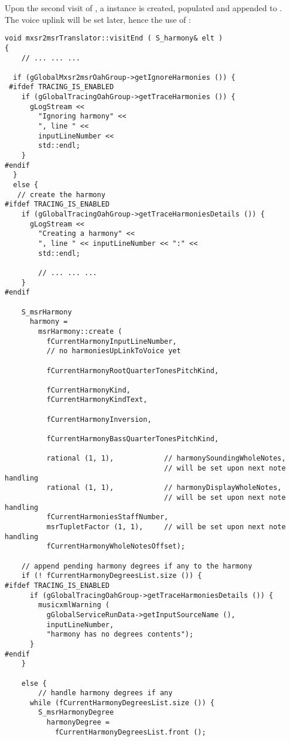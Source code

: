 Upon the second visit of , a  instance is created, populated and appended to .\\
The voice uplink will be set later, hence the use of :
\begin{lstlisting}[language=CPlusPlus]
void mxsr2msrTranslator::visitEnd ( S_harmony& elt )
{
	// ... ... ...

  if (gGlobalMxsr2msrOahGroup->getIgnoreHarmonies ()) {
 #ifdef TRACING_IS_ENABLED
    if (gGlobalTracingOahGroup->getTraceHarmonies ()) {
      gLogStream <<
        "Ignoring harmony" <<
        ", line " <<
        inputLineNumber <<
        std::endl;
    }
#endif
  }
  else {
   // create the harmony
#ifdef TRACING_IS_ENABLED
    if (gGlobalTracingOahGroup->getTraceHarmoniesDetails ()) {
      gLogStream <<
        "Creating a harmony" <<
        ", line " << inputLineNumber << ":" <<
        std::endl;

    	// ... ... ...
    }
#endif

    S_msrHarmony
      harmony =
        msrHarmony::create (
          fCurrentHarmonyInputLineNumber,
          // no harmoniesUpLinkToVoice yet

          fCurrentHarmonyRootQuarterTonesPitchKind,

          fCurrentHarmonyKind,
          fCurrentHarmonyKindText,

          fCurrentHarmonyInversion,

          fCurrentHarmonyBassQuarterTonesPitchKind,

          rational (1, 1),            // harmonySoundingWholeNotes,
                                      // will be set upon next note handling
          rational (1, 1),            // harmonyDisplayWholeNotes,
                                      // will be set upon next note handling
          fCurrentHarmoniesStaffNumber,
          msrTupletFactor (1, 1),     // will be set upon next note handling
          fCurrentHarmonyWholeNotesOffset);

    // append pending harmony degrees if any to the harmony
    if (! fCurrentHarmonyDegreesList.size ()) {
#ifdef TRACING_IS_ENABLED
      if (gGlobalTracingOahGroup->getTraceHarmoniesDetails ()) {
        musicxmlWarning (
          gGlobalServiceRunData->getInputSourceName (),
          inputLineNumber,
          "harmony has no degrees contents");
      }
#endif
    }

    else {
    	// handle harmony degrees if any
      while (fCurrentHarmonyDegreesList.size ()) {
        S_msrHarmonyDegree
          harmonyDegree =
            fCurrentHarmonyDegreesList.front ();


\end{lstlisting}
